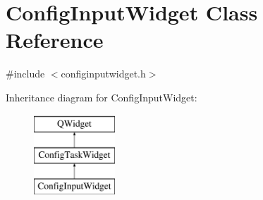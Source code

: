\hypertarget{class_config_input_widget}{\section{Config\-Input\-Widget Class Reference}
\label{class_config_input_widget}
}


{\ttfamily \#include $<$configinputwidget.\-h$>$}

Inheritance diagram for Config\-Input\-Widget\-:\begin{figure}[H]
\begin{center}
\leavevmode
\includegraphics[height=3.000000cm]{class_config_input_widget}
\end{center}
\end{figure}
